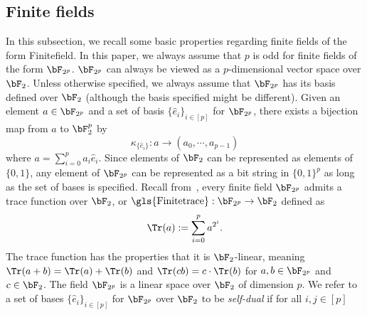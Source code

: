 


\subsection{Finite fields} \label{sec:fieldintro}
In this subsection, we recall some basic properties regarding finite fields of the form \gls{Finitefield}. In this paper, we always assume that $p$ is odd for finite fields of the form $\bF_{2^p}$. $\bF_{2^p}$ can always be viewed as a $p$-dimensional vector space over $\bF_2$. Unless otherwise specified, we always assume that $\bF_{2^p}$ has its basis defined over $\bF_2$ (although the basis specified might be different). Given an element $a \in \bF_{2^{p}}$ and a set of basis $\{ \hat{e}_i\}_{i \in [p]}$ for $\bF_{2^p}$, there exists a bijection map from $a$ to $\bF_2^{p}$ by 
\begin{equation} \label{eq:finitefieldbijection}
	\kappa_{\{ \hat{e}_i\}}: a \rightarrow (a_0, \cdots, a_{p-1})
\end{equation}
where $a = \sum_{i=0}^p a_i \hat{e}_i$. Since elements of $\bF_2$ can be represented as elements of $\{0,1\}$, any element of $\bF_{2^p}$ can be represented as a bit string in $\{0,1\}^p$ as long as the set of bases is specified. Recall from~\cite[Definition 2.1.80]{mullenHandbookFiniteFields2013}, every finite field $\bF_{2^{p}}$ admits a trace function over $\bF_2$, or $\text{\gls{Finitetrace}}:\bF_{2^p} \rightarrow \bF_2$ defined as
\begin{equation*}
	\Tr(a) := \sum_{i = 0}^{p} a^{2^i}.
\end{equation*}
The trace function has the properties that it is $\bF_{2}$-linear, meaning $\Tr(a + b) = \Tr(a) + \Tr(b)$ and $\Tr(cb) = c \cdot \Tr(b)$ for $a, b\in \bF_{2^p}$ and $c \in \bF_{2}$. The field $\bF_{2^p}$ is a linear space over $\bF_2$ of dimension $p$. We refer to a set of bases $\{ \hat{e}_i\}_{i \in [p]}$ for $\bF_{2^p}$ over $\bF_2$ to be \textit{self-dual} if for all $i,j \in [p]$
